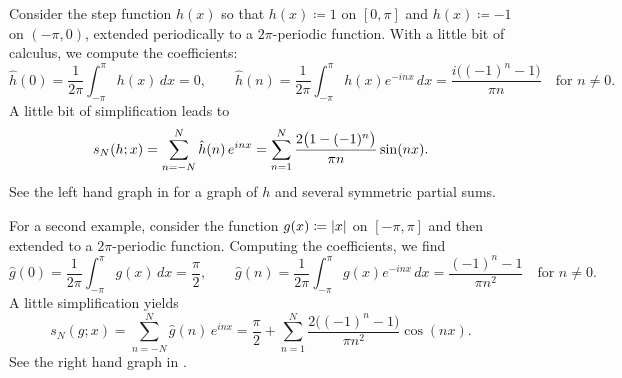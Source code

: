 \begin{example}
Consider the step function $h(x)$ so that $h(x) \coloneqq 1$
on $[0,\pi]$ and $h(x) \coloneqq -1$ on $(-\pi,0)$, extended periodically to a
$2\pi$-periodic function.  With a little bit of calculus,
we compute the coefficients:
\begin{equation*}
\hat{h}(0)
=
\frac{1}{2\pi} \int_{-\pi}^\pi h(x) \, dx = 0,
\qquad
\hat{h}(n)
=
\frac{1}{2\pi} \int_{-\pi}^\pi h(x) e^{-inx} \, dx
=
\frac{i\bigl( (-1)^n-1 \bigr)}{\pi n} \quad \text{for } n \neq 0 .
\end{equation*}
A little bit of simplification leads to
\begin{equation*}
s_N(h;x) =
\sum_{n=-N}^N \hat{h}(n) \,e^{inx} 
=
\sum_{n=1}^N \frac{2\bigl(1-(-1)^n\bigr)}{\pi n} \sin(n x) .
\avoidbreak
\end{equation*}
See the left hand graph in 
for a graph of $h$ and several symmetric partial sums.

For a second example, consider the function $g(x) \coloneqq \lvert {x} \rvert$
on $[-\pi,\pi]$ and then extended to a $2\pi$-periodic function.
Computing the coefficients, we find
\begin{equation*}
\hat{g}(0)
=
\frac{1}{2\pi} \int_{-\pi}^\pi g(x) \, dx = \frac{\pi}{2},
\qquad
\hat{g}(n)
=
\frac{1}{2\pi} \int_{-\pi}^\pi g(x) e^{-inx} \, dx
=
\frac{(-1)^n-1}{\pi n^2} \quad \text{for } n \neq 0 .
\end{equation*}
A little simplification yields
\begin{equation*}
s_N(g;x) =
\sum_{n=-N}^N \hat{g}(n) \,e^{inx} 
=
\frac{\pi}{2} + 
\sum_{n=1}^N \frac{2\bigl((-1)^n-1\bigr)}{\pi n^2} \cos(n x) .
\end{equation*}
See the right hand graph in .


\end{example}
